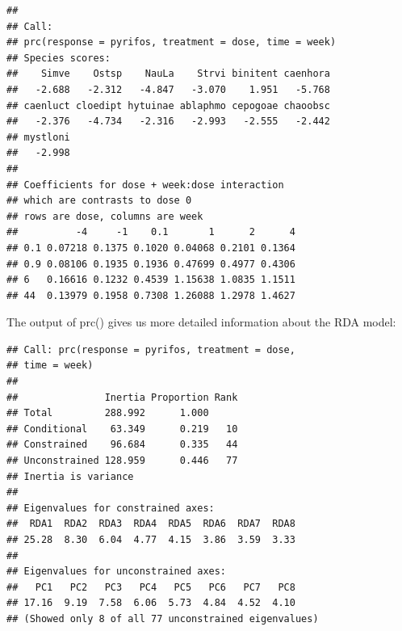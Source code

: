 \documentclass{tufte-book}\usepackage{knitr}
\begin{document}
\begin{knitrout}
\color{fgcolor}\begin{kframe}
\begin{verbatim}
## 
## Call:
## prc(response = pyrifos, treatment = dose, time = week) 
## Species scores:
##    Simve    Ostsp    NauLa    Strvi binitent caenhora 
##   -2.688   -2.312   -4.847   -3.070    1.951   -5.768 
## caenluct cloedipt hytuinae ablaphmo cepogoae chaoobsc 
##   -2.376   -4.734   -2.316   -2.993   -2.555   -2.442 
## mystloni 
##   -2.998 
## 
## Coefficients for dose + week:dose interaction
## which are contrasts to dose 0 
## rows are dose, columns are week
##          -4     -1    0.1       1      2      4
## 0.1 0.07218 0.1375 0.1020 0.04068 0.2101 0.1364
## 0.9 0.08106 0.1935 0.1936 0.47699 0.4977 0.4306
## 6   0.16616 0.1232 0.4539 1.15638 1.0835 1.1511
## 44  0.13979 0.1958 0.7308 1.26088 1.2978 1.4627
\end{verbatim}
\end{kframe}
\end{knitrout}



The output of prc() gives us more detailed information about the RDA model:
\begin{knitrout}
\color{fgcolor}\begin{kframe}
\begin{alltt}
\end{alltt}
\end{kframe}
\end{knitrout}

\begin{knitrout}
\color{fgcolor}\begin{kframe}
\begin{verbatim}
## Call: prc(response = pyrifos, treatment = dose,
## time = week)
## 
##               Inertia Proportion Rank
## Total         288.992      1.000     
## Conditional    63.349      0.219   10
## Constrained    96.684      0.335   44
## Unconstrained 128.959      0.446   77
## Inertia is variance 
## 
## Eigenvalues for constrained axes:
##  RDA1  RDA2  RDA3  RDA4  RDA5  RDA6  RDA7  RDA8 
## 25.28  8.30  6.04  4.77  4.15  3.86  3.59  3.33 
## 
## Eigenvalues for unconstrained axes:
##   PC1   PC2   PC3   PC4   PC5   PC6   PC7   PC8 
## 17.16  9.19  7.58  6.06  5.73  4.84  4.52  4.10 
## (Showed only 8 of all 77 unconstrained eigenvalues)
\end{verbatim}
\end{kframe}
\end{knitrout}
\end{document}
